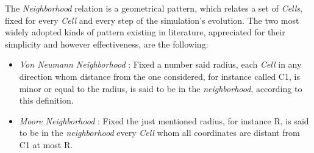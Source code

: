 \documentclass[12pt,a4paper,fleqn]{report}
\begin{document}
The \textit{Neighborhood} relation is a geometrical pattern, which relates a set of \textit{Cells}, fixed for every \textit{Cell} and every step of the simulation's evolution. The two most widely adopted kinds of pattern existing in literature, appreciated for their simplicity and however effectiveness, are the following:
\begin{itemize}
\item
\textit{Von Neumann Neighborhood} : Fixed a number said radius, each \textit{Cell} in any direction whom distance from the one considered, for instance called C1, is minor or equal to the radius, is said to be in the \textit{neighborhood}, according to this definition.
\item
 \textit{Moore Neighborhood} : Fixed the just mentioned radius, for instance R, is said to be in the \textit{neighborhood} every \textit{Cell} whom all coordinates are distant from C1 at most R.
\end{itemize}
\end{document}
